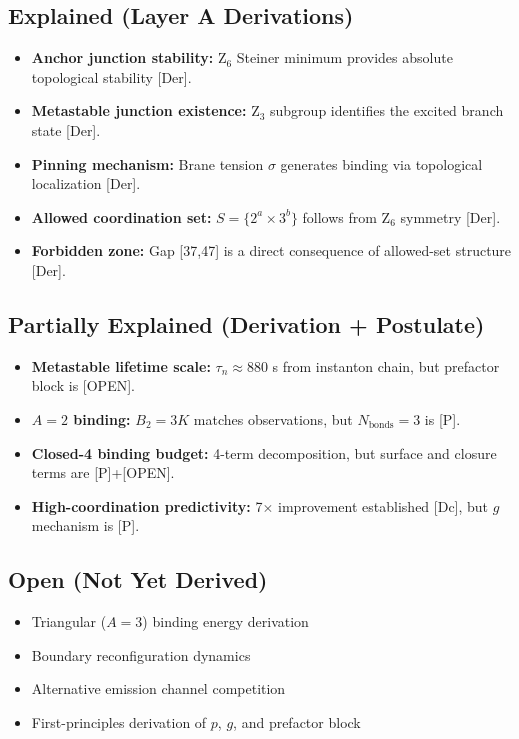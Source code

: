\subsection{Explained (Layer A Derivations)}

\begin{itemize}
    \item \textbf{Anchor junction stability:} Z$_6$ Steiner minimum
          provides absolute topological stability [Der].
    \item \textbf{Metastable junction existence:} Z$_3$ subgroup identifies
          the excited branch state [Der].
    \item \textbf{Pinning mechanism:} Brane tension $\sigma$ generates
          binding via topological localization [Der].
    \item \textbf{Allowed coordination set:} $S = \{2^a \times 3^b\}$
          follows from Z$_6$ symmetry [Der].
    \item \textbf{Forbidden zone:} Gap [37,47] is a direct consequence
          of allowed-set structure [Der].
\end{itemize}

\subsection{Partially Explained (Derivation + Postulate)}

\begin{itemize}
    \item \textbf{Metastable lifetime scale:} $\tau_n \approx 880$ s
          from instanton chain, but prefactor block is [OPEN].
    \item \textbf{$A = 2$ binding:} $B_2 = 3K$ matches observations, but
          $N_{\text{bonds}} = 3$ is [P].
    \item \textbf{Closed-4 binding budget:} 4-term decomposition, but
          surface and closure terms are [P]+[OPEN].
    \item \textbf{High-coordination predictivity:} 7$\times$ improvement
          established [Dc], but $g$ mechanism is [P].
\end{itemize}

\subsection{Open (Not Yet Derived)}

\begin{itemize}
    \item Triangular ($A = 3$) binding energy derivation
    \item Boundary reconfiguration dynamics
    \item Alternative emission channel competition
    \item First-principles derivation of $p$, $g$, and prefactor block
\end{itemize}

